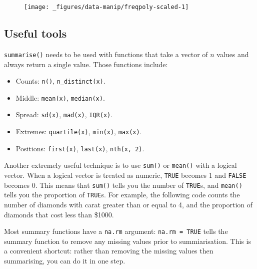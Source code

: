 \begin{figure}[H]
  \centering
  \texttt{[image: \_figures/data-manip/freqpoly-scaled-1]}
\end{figure}

\subsection{Useful tools}

\texttt{summarise()} needs to be used with functions that take a vector
of \(n\) values and always return a single value. Those functions
include:

\begin{itemize}
\tightlist
\item
  Counts: \texttt{n()}, \texttt{n\_distinct(x)}.
\item
  Middle: \texttt{mean(x)}, \texttt{median(x)}.
\item
  Spread: \texttt{sd(x)}, \texttt{mad(x)}, \texttt{IQR(x)}.
\item
  Extremes: \texttt{quartile(x)}, \texttt{min(x)}, \texttt{max(x)}.
\item
  Positions: \texttt{first(x)}, \texttt{last(x)}, \texttt{nth(x,\ 2)}.
\end{itemize}

Another extremely useful technique is to use \texttt{sum()} or
\texttt{mean()} with a logical vector. When a logical vector is treated
as numeric, \texttt{TRUE} becomes 1 and \texttt{FALSE} becomes 0. This
means that \texttt{sum()} tells you the number of \texttt{TRUE}s, and
\texttt{mean()} tells you the proportion of \texttt{TRUE}s. For example,
the following code counts the number of diamonds with carat greater than
or equal to 4, and the proportion of diamonds that cost less than
\$1000.

\begin{Shaded}
\begin{Highlighting}[]
   \StringTok{ }\NormalTok{), }
   \StringTok{ }\NormalTok{)}
\NormalTok{)}
\CommentTok{#> }
\end{Highlighting}
\end{Shaded}

Most summary functions have a \texttt{na.rm} argument:
\texttt{na.rm\ =\ TRUE} tells the summary function to remove any missing
values prior to summiarisation. This is a convenient shortcut: rather
than removing the missing values then summarising, you can do it in one
step.

